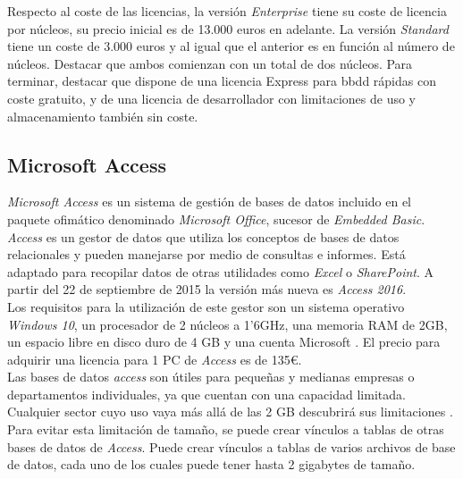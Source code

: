 \documentclass[3pt]{article}
\begin{document}
Respecto al coste de las licencias, la versión \emph{Enterprise} tiene su coste de licencia por núcleos, su precio inicial es de 13.000 euros en adelante. La versión \emph{Standard} tiene un coste de 3.000 euros y al igual que el anterior es en función al número de núcleos. Destacar que ambos comienzan con un total de dos núcleos. Para terminar, destacar que dispone de una licencia Express para bbdd rápidas con coste gratuito, y de una licencia de desarrollador con limitaciones de uso y almacenamiento también sin coste.\\

\subsection{Microsoft Access}
\emph{Microsoft Access} es un sistema de gestión de bases de datos incluido en el paquete ofimático denominado \emph{Microsoft Office}, sucesor de \emph{Embedded Basic}. \emph{Access} es un gestor de datos que utiliza los conceptos de bases de datos relacionales y pueden manejarse por medio de consultas e informes. Está adaptado para recopilar datos de otras utilidades como \emph{Excel} o \emph{SharePoint}. A partir del 22 de septiembre de 2015 la versión más nueva es \emph{Access 2016}. \cite{ACC:1} \\

Los requisitos para la utilización de este gestor son un sistema operativo \emph{Windows 10}, un procesador de 2 núcleos a 1'6GHz, una memoria RAM de 2GB, un espacio libre en disco duro de 4 GB y una cuenta Microsoft \cite{ACC:2}. El precio para adquirir una licencia para 1 PC de \emph{Access} es de 135\euro. \cite{ACC:3} \\
Las bases de datos \emph{access} son útiles para pequeñas y medianas empresas o departamentos individuales, ya que cuentan con una capacidad limitada. Cualquier sector cuyo uso vaya más allá de las 2 GB descubrirá sus limitaciones \cite{ACC:4}. Para evitar esta limitación de tamaño, se puede crear vínculos a tablas de otras bases de datos de \emph{Access}. Puede crear vínculos a tablas de varios archivos de base de datos, cada uno de los cuales puede tener hasta 2 gigabytes de tamaño. \cite{ACC:5}\\
\end{document}

